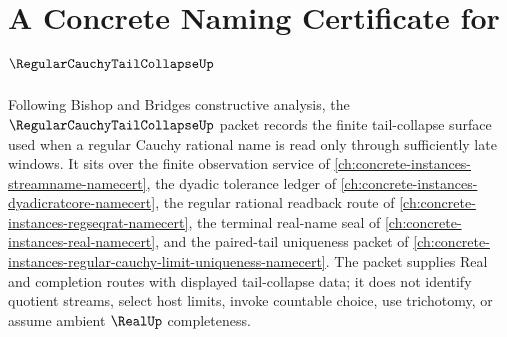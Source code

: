 \chapter{A Concrete Naming Certificate for $\RegularCauchyTailCollapseUp$}
\label{ch:concrete-instances-regular-cauchy-tail-collapse-namecert}

Following Bishop and Bridges constructive analysis, the $\RegularCauchyTailCollapseUp$ packet records the finite tail-collapse surface used when a regular Cauchy rational name is read only through sufficiently late windows. It sits over the finite observation service of \autoref{ch:concrete-instances-streamname-namecert}, the dyadic tolerance ledger of \autoref{ch:concrete-instances-dyadicratcore-namecert}, the regular rational readback route of \autoref{ch:concrete-instances-regseqrat-namecert}, the terminal real-name seal of \autoref{ch:concrete-instances-real-namecert}, and the paired-tail uniqueness packet of \autoref{ch:concrete-instances-regular-cauchy-limit-uniqueness-namecert}. The packet supplies Real and completion routes with displayed tail-collapse data; it does not identify quotient streams, select host limits, invoke countable choice, use trichotomy, or assume ambient $\RealUp$ completeness.

